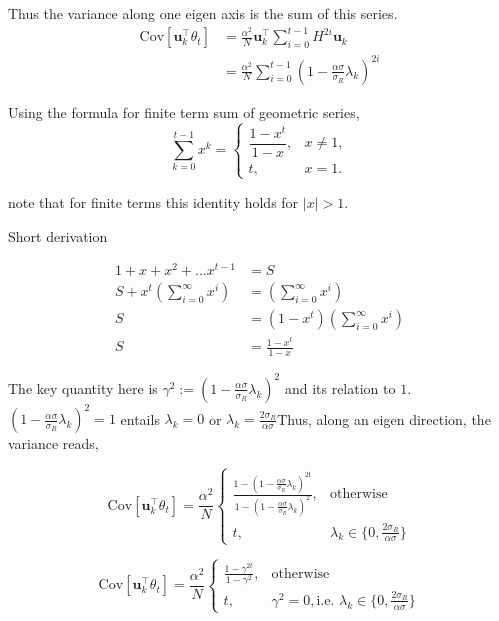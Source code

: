     Thus the variance along one eigen axis is the sum of this series.
    \begin{align*}
    \mathrm{Cov}[\mathbf{u}_{k}^{\top}\theta_{t}] & =\frac{\alpha^{2}}{N}\mathbf{u}_{k}^{\top}\sum_{i=0}^{t-1}H^{2i}\mathbf{u}_{k}\\
     & =\frac{\alpha^{2}}{N}\sum_{i=0}^{t-1}(1-\frac{\alpha\sigma}{\sigma_{R}}\lambda_{k})^{2i}
    \end{align*}
    
    Using the formula for finite term sum of geometric series, 
    \[
    \sum_{k=0}^{t-1}x^{k}=\begin{cases}
    \dfrac{1-x^{t}}{1-x}, & x\neq1,\\[6pt]
    t, & x=1.
    \end{cases}
    \]
    
    note that for finite terms this identity holds for $|x|>1$. 
    
    \noindent\begin{minipage}[t]{1\columnwidth}%
    Short derivation
    
    \begin{align*}
    1+x+x^{2}+...x^{t-1} & =S\\
    S+x^{t}(\sum_{i=0}^{\infty}x^{i}) & =(\sum_{i=0}^{\infty}x^{i})\\
    S & =(1-x^{t})(\sum_{i=0}^{\infty}x^{i})\\
    S & =\frac{1-x^{t}}{1-x}
    \end{align*}
    \end{minipage}
    
    The key quantity here is $\gamma^{2}:=(1-\frac{\alpha\sigma}{\sigma_{R}}\lambda_{k})^{2}$
    and its relation to $1$. $(1-\frac{\alpha\sigma}{\sigma_{R}}\lambda_{k})^{2}=1$
    entails $\lambda_{k}=0$ or $\lambda_{k}=\frac{2\sigma_{R}}{\alpha\sigma}$Thus,
    along an eigen direction, the variance reads, 
    
    \[
    \mathrm{Cov}[\mathbf{u}_{k}^{\top}\theta_{t}]=\frac{\alpha^{2}}{N}\begin{cases}
    \frac{1-(1-\frac{\alpha\sigma}{\sigma_{R}}\lambda_{k})^{2t}}{1-(1-\frac{\alpha\sigma}{\sigma_{R}}\lambda_{k})^{2}}, & \text{otherwise}\\[6pt]
    t, & \lambda_{k}\in\{0,\frac{2\sigma_{R}}{\alpha\sigma}\}
    \end{cases}
    \]
    
    \[
    \mathrm{Cov}[\mathbf{u}_{k}^{\top}\theta_{t}]=\frac{\alpha^{2}}{N}\begin{cases}
    \frac{1-\gamma^{2t}}{1-\gamma^{2}}, & \text{otherwise}\\[6pt]
    t, & \gamma^{2}=0,\text{i.e. }\lambda_{k}\in\{0,\frac{2\sigma_{R}}{\alpha\sigma}\}
    \end{cases}
    \]
    
